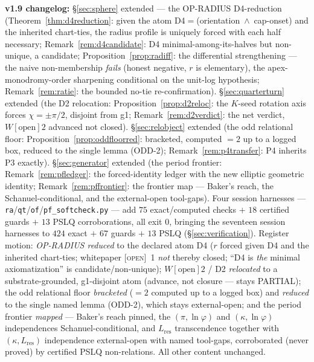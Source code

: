\documentclass[11pt]{article}
\newcommand{\tagO}{\textcolor{cO}{\textsc{[open]}}}
\newcommand{\gp}{\varphi}
\theoremstyle{plain}
\theoremstyle{definition}
\theoremstyle{remark}
\begin{document}
\smallskip\noindent
\textbf{v1.9 changelog:} \S\ref{sec:sphere} extended --- the OP-RADIUS
D4-reduction (Theorem~\ref{thm:d4reduction}: given the atom
D4${}={}$(orientation~$\wedge$~cap-onset) and the inherited chart-ties, the
radius profile is uniquely forced with each half necessary;
Remark~\ref{rem:d4candidate}: D4 minimal-among-its-halves but non-unique, a
candidate; Proposition~\ref{prop:radiff}: the differential strengthening --- the
naive non-membership \emph{fails} (honest negative, $r$ is elementary), the
apex-monodromy-order sharpening conditional on the unit-log hypothesis;
Remark~\ref{rem:ratie}: the bounded no-tie re-confirmation).
\S\ref{sec:quarterturn} extended (the D2 relocation:
Proposition~\ref{prop:d2reloc}: the $K$-seed rotation axis forces
$\chi=\pm\pi/2$, disjoint from g1; Remark~\ref{rem:d2verdict}: the net verdict,
$W[\text{open}]2$ advanced not closed). \S\ref{sec:relobject} extended (the odd
relational floor: Proposition~\ref{prop:oddfloorred}: bracketed, computed $=2$
up to a logged box, reduced to the single lemma (ODD-2);
Remark~\ref{rem:p4transfer}: P4 inherits P3 exactly). \S\ref{sec:generator}
extended (the period frontier: Remark~\ref{rem:pfledger}: the forced-identity
ledger with the new elliptic geometric identity; Remark~\ref{rem:pffrontier}:
the frontier map --- Baker's reach, the Schanuel-conditional, and the
external-open tool-gaps). Four session harnesses ---
\texttt{ra}/\texttt{qt}/\texttt{of}/\texttt{pf\_softcheck.py} --- add $75$
exact/computed checks $+$ $18$ certified guards $+$ $13$ PSLQ corroborations,
all exit 0, bringing the seventeen session harnesses to $424$ exact $+$ $67$
guards $+$ $13$ PSLQ (\S\ref{sec:verification}). Register motion:
\emph{OP-RADIUS reduced} to the declared atom D4 ($r$ forced given D4 and the
inherited chart-ties; whitepaper \tagO{}~1 \emph{not} thereby closed; ``D4 is
\emph{the} minimal axiomatization'' is candidate/non-unique);
$W[\text{open}]2$ / D2 \emph{relocated} to a substrate-grounded, g1-disjoint
atom (advance, not closure --- stays PARTIAL); the odd relational floor
\emph{bracketed} ($=2$ computed up to a logged box) and \emph{reduced} to the
single named lemma (ODD-2), which stays external-open; and the period frontier
\emph{mapped} --- Baker's reach pinned, the $(\pi,\ln\gp)$ and $(\kappa,\ln\gp)$
independences Schanuel-conditional, and $L_{\mathrm{res}}$ transcendence
together with $(\kappa,L_{\mathrm{res}})$ independence external-open with named
tool-gaps, corroborated (never proved) by certified PSLQ non-relations. All
other content unchanged.
\end{document}
